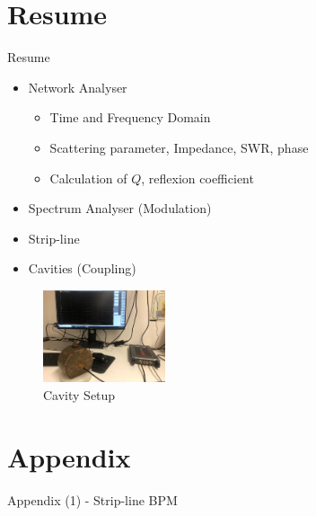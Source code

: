 \documentclass{beamer}
\begin{document}
\section{Resume}
\begin{frame}[t,fragile]{Resume}
\begin{itemize}
\item Network Analyser
\begin{itemize}
\item Time and Frequency Domain
\item Scattering parameter, Impedance, SWR, phase
\item Calculation of $Q$, reflexion coefficient
\end{itemize}
\item Spectrum Analyser (Modulation)

\item Strip-line
\item Cavities (Coupling)
\end{itemize}
\begin{figure}
  \centering
  \includegraphics[width=0.32\textwidth]{4_resume}
  \caption{Cavity Setup}
\end{figure}
\end{frame}

\section{Appendix}
\begin{frame}[t,fragile]{Appendix (1) - Strip-line BPM}
\begin{figure}
  \centering\setcounter{subfigure}{0}
  \quad
  \\
\end{figure}
\end{frame}
\end{document}
